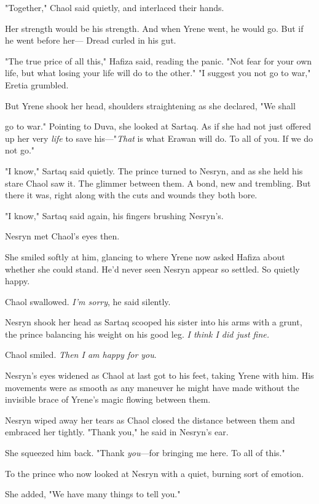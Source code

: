 "Together," Chaol said quietly, and interlaced their hands.

Her strength would be his strength. And when Yrene went, he would go. But if he went before her--- Dread curled in his gut.

"The true price of all this," Hafiza said, reading the panic. "Not fear for your own life, but what losing your life will do to the other." "I suggest you not go to war," Eretia grumbled.

But Yrene shook her head, shoulders straightening as she declared, "We shall

go to war." Pointing to Duva, she looked at Sartaq. As if she had not just offered up her very \emph{life} to save his---"\emph{That} is what Erawan will do. To all of you. If we do not go."

"I know," Sartaq said quietly. The prince turned to Nesryn, and as she held his stare  Chaol saw it. The glimmer between them. A bond, new and trembling. But there it was, right along with the cuts and wounds they both bore.

"I know," Sartaq said again, his fingers brushing Nesryn's.

Nesryn met Chaol's eyes then.

She smiled softly at him, glancing to where Yrene now asked Hafiza about whether she could stand. He'd never seen Nesryn appear so 
settled. So quietly happy.

Chaol swallowed. \emph{I'm sorry}, he said silently.

Nesryn shook her head as Sartaq scooped his sister into his arms with a grunt, the prince balancing his weight on his good leg. \emph{I think I did just fine.}

Chaol smiled. \emph{Then I am happy for you}.

Nesryn's eyes widened as Chaol at last got to his feet, taking Yrene with him. His movements were as smooth as any maneuver he might have made without the invisible brace of Yrene's magic flowing between them.

Nesryn wiped away her tears as Chaol closed the distance between them and embraced her tightly. "Thank you," he said in Nesryn's ear.

She squeezed him back. "Thank \emph{you}---for bringing me here. To all of this."

To the prince who now looked at Nesryn with a quiet, burning sort of emotion.

She added, "We have many things to tell you."


